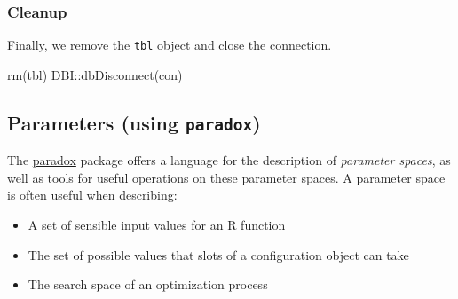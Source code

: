 \documentclass[]{article}
\newenvironment{Shaded}{}{}
\newcommand{\KeywordTok}[1]{\textcolor[rgb]{0.00,0.00,1.00}{#1}}
\newcommand{\NormalTok}[1]{#1}
\newcommand{\OperatorTok}[1]{#1}
\newcommand{\StringTok}[1]{\textcolor[rgb]{0.00,0.50,0.50}{#1}}
\providecommand{\tightlist}{%
  \setlength{\itemsep}{0pt}\setlength{\parskip}{0pt}}
\renewenvironment{Shaded} {\begin{snugshade}\small} {\end{snugshade}}
\begin{document}
\begin{Shaded}
\end{Shaded}

\hypertarget{cleanup}{%
\subsubsection{Cleanup}\label{cleanup}}

Finally, we remove the \texttt{tbl} object and close the connection.

\begin{Shaded}
\begin{Highlighting}[]
\KeywordTok{rm}\NormalTok{(tbl)}
\NormalTok{DBI}\OperatorTok{::}\KeywordTok{dbDisconnect}\NormalTok{(con)}
\end{Highlighting}
\end{Shaded}

\hypertarget{paradox}{%
\subsection{\texorpdfstring{Parameters (using \texttt{paradox})}{Parameters (using paradox)}}\label{paradox}}

The \href{https://paradox.mlr-org.com}{paradox} package offers a language for the description of \emph{parameter spaces}, as well as tools for useful operations on these parameter spaces.
A parameter space is often useful when describing:

\begin{itemize}
\tightlist
\item
  A set of sensible input values for an R function
\item
  The set of possible values that slots of a configuration object can take
\item
  The search space of an optimization process
\end{itemize}
\end{document}
